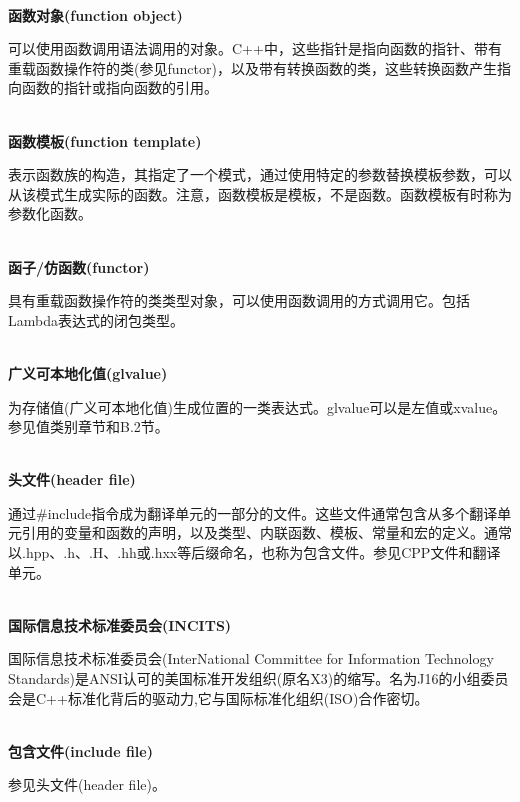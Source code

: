 \hspace*{\fill} \\ %
\noindent
\textbf{函数对象(function object)}

可以使用函数调用语法调用的对象。C++中，这些指针是指向函数的指针、带有重载函数操作符的类(参见functor)，以及带有转换函数的类，这些转换函数产生指向函数的指针或指向函数的引用。

\hspace*{\fill} \\ %
\noindent
\textbf{函数模板(function template)}

表示函数族的构造，其指定了一个模式，通过使用特定的参数替换模板参数，可以从该模式生成实际的函数。注意，函数模板是模板，不是函数。函数模板有时称为参数化函数。

\hspace*{\fill} \\ %
\noindent
\textbf{函子/仿函数(functor)}

具有重载函数操作符的类类型对象，可以使用函数调用的方式调用它。包括Lambda表达式的闭包类型。

\hspace*{\fill} \\ %
\noindent
\textbf{广义可本地化值(glvalue)}

为存储值(广义可本地化值)生成位置的一类表达式。glvalue可以是左值或xvalue。参见值类别章节和B.2节。

\hspace*{\fill} \\ %
\noindent
\textbf{头文件(header file)}

通过\#include指令成为翻译单元的一部分的文件。这些文件通常包含从多个翻译单元引用的变量和函数的声明，以及类型、内联函数、模板、常量和宏的定义。通常以.hpp、.h、.H、.hh或.hxx等后缀命名，也称为包含文件。参见CPP文件和翻译单元。

\hspace*{\fill} \\ %
\noindent
\textbf{国际信息技术标准委员会(INCITS)}

国际信息技术标准委员会(InterNational Committee for Information Technology Standards)是ANSI认可的美国标准开发组织(原名X3)的缩写。名为J16的小组委员会是C++标准化背后的驱动力,它与国际标准化组织(ISO)合作密切。

\hspace*{\fill} \\ %
\noindent
\textbf{包含文件(include file)}

参见头文件(header file)。

